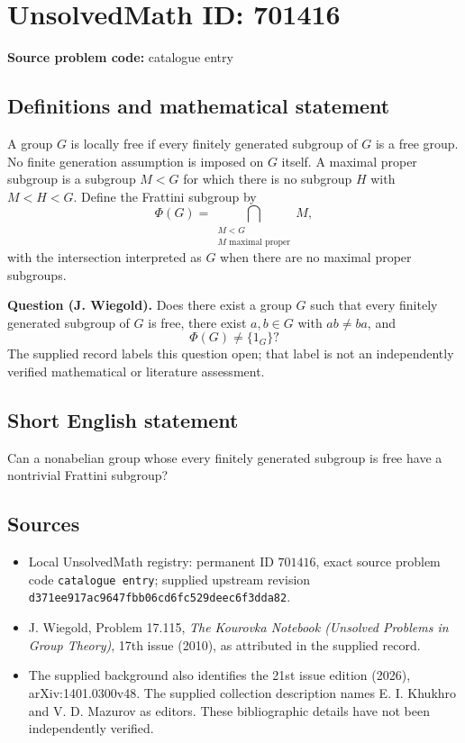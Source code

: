 \documentclass[11pt]{article}
\begin{document}
\section*{UnsolvedMath ID: 701416}
\textbf{Source problem code:} catalogue entry
\subsection{Definitions and mathematical statement}
A group \(G\) is locally free if every finitely generated subgroup of \(G\) is a free group. No finite generation assumption is imposed on \(G\) itself. A maximal proper subgroup is a subgroup \(M<G\) for which there is no subgroup \(H\) with \(M<H<G\). Define the Frattini subgroup by
\[
\Phi(G)=\bigcap_{\substack{M<G\\ M\text{ maximal proper}}}M,
\]
with the intersection interpreted as \(G\) when there are no maximal proper subgroups.

\textbf{Question (J. Wiegold).} Does there exist a group \(G\) such that every finitely generated subgroup of \(G\) is free, there exist \(a,b\in G\) with \(ab\ne ba\), and
\[
\Phi(G)\ne\{1_G\}?
\]
The supplied record labels this question open; that label is not an independently verified mathematical or literature assessment.
\subsection{Short English statement}
Can a nonabelian group whose every finitely generated subgroup is free have a nontrivial Frattini subgroup?
\subsection{Sources}
\begin{itemize}
\item Local UnsolvedMath registry: permanent ID \(701416\), exact source problem code \texttt{catalogue entry}; supplied upstream revision \texttt{d371ee917ac9647fbb06cd6fc529deec6f3dda82}.
\item J. Wiegold, Problem 17.115, \emph{The Kourovka Notebook (Unsolved Problems in Group Theory)}, 17th issue (2010), as attributed in the supplied record.
\item The supplied background also identifies the 21st issue edition (2026), arXiv:1401.0300v48. The supplied collection description names E. I. Khukhro and V. D. Mazurov as editors. These bibliographic details have not been independently verified.
\end{itemize}
\end{document}

